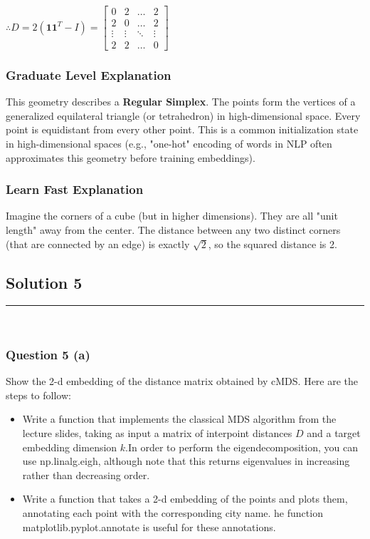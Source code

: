 \documentclass{article}
\begin{document}
\subsubsection*{\normalfont}{$\therefore D = 2(\mathbf{1}\mathbf{1}^T - I) = \begin{bmatrix} 0 & 2 & \dots & 2 \\ 2 & 0 & \dots & 2 \\ \vdots & \vdots & \ddots & \vdots \\ 2 & 2 & \dots & 0 \end{bmatrix}$}

\subsubsection*{Graduate Level Explanation}
This geometry describes a \textbf{Regular Simplex}. The points form the vertices of a generalized equilateral triangle (or tetrahedron) in high-dimensional space. Every point is equidistant from every other point. This is a common initialization state in high-dimensional spaces (e.g., "one-hot" encoding of words in NLP often approximates this geometry before training embeddings).

\subsubsection*{Learn Fast Explanation}
Imagine the corners of a cube (but in higher dimensions). They are all "unit length" away from the center. The distance between any two distinct corners (that are connected by an edge) is exactly $\sqrt{2}$, so the squared distance is 2.

\newpage

\subsection*{Solution 5}
\noindent\rule{\textwidth}{0.4pt}\\
\subsubsection*{Question 5 (a)}
\begin{flushleft}
Show the 2-d embedding of the distance matrix obtained by cMDS. Here are the steps to follow:
\begin{itemize}
\item Write a function that implements the classical MDS algorithm from the lecture slides, taking as input a matrix of interpoint distances $D$ and a target embedding dimension $k$.In order
to perform the eigendecomposition, you can use np.linalg.eigh, although note that this
returns eigenvalues in increasing rather than decreasing order.
\item Write a function that takes a 2-d embedding of the points and plots them, annotating each point with the corresponding city name. he function matplotlib.pyplot.annotate is
useful for these annotations.
\end{itemize}
\end{flushleft}
\end{document}
